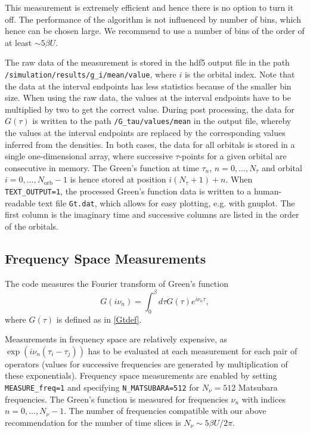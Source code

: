 \documentclass[aps,prb,floatfix,superscriptaddress,twocolumn,notitlepage]{revtex4-1}
\newcommand{\iom}{{\ensuremath{i\nu}}}
\begin{document}
This measurement is extremely efficient and hence there is no option to turn it off. The performance of the algorithm is not influenced by number of bins, which hence can be chosen large. We recommend to use a number of bins of the order of at least $\sim 5\beta U$.

The raw data of the measurement is stored in the hdf5 output file in the path \verb#/simulation/results/g_i/mean/value#, where $i$ is the orbital index. Note that the data at the interval endpoints has less statistics because of the smaller bin size. When using the raw data, the values at the interval endpoints have to be multiplied by two to get the correct value. During post processing, the data for $G(\tau)$ is written to the path \verb#/G_tau/values/mean# in the output file, whereby the values at the interval endpoints are replaced by the corresponding values inferred from the densities.
In both cases, the data for all orbitals is stored in a single one-dimensional array, where successive $\tau$-points for a given orbital are consecutive in memory. The Green's function at time $\tau_{n}$, $n=0,\ldots,N_{\tau}$ and orbital $i=0,\ldots,N_{\text{orb}}-1$ is hence stored at position $i(N_{\tau}+1)+n$.
When \verb#TEXT_OUTPUT=1#, the processed Green's function data is written to a human-readable text file \verb#Gt.dat#, which allows for easy plotting, e.g. with gnuplot. The first column is the imaginary time and successive columns are listed in the order of the orbitals.

\subsection{Frequency Space Measurements}

The code measures the Fourier transform of Green's function 
\begin{equation}
G(\iom_{n}) = \int_{0}^{\beta} d\tau G(\tau) e^{\iom_{n}\tau},
\end{equation}
where $G(\tau)$ is defined as in \eqref{Gtdef}.

Measurements in frequency space are relatively expensive, as $\exp(\iom_{n} (\tau_i-\tau_j))$ has to be evaluated at each measurement for each pair of operators (values for successive frequencies are generated by multiplication of these exponentials). Frequency space measurements are enabled by setting \verb#MEASURE_freq=1# and specifying \verb#N_MATSUBARA=512# for $N_{\nu}=512$ Matsubara frequencies. The Green's function is measured for frequencies $\nu_{n}$ with indices $n=0,\ldots,N_{\nu}-1$. The number of frequencies compatible with our above recommendation for the number of time slices is $N_{\nu}\sim 5\beta U/2\pi$.
\end{document}
